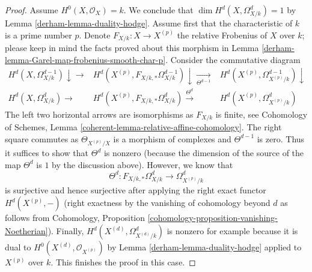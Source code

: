 \begin{proof}
\medskip\noindent
Assume $H^0(X, \mathcal{O}_X) = k$. We conclude that
$\dim H^d(X, \Omega^d_{X/k}) = 1$ by Lemma \ref{derham-lemma-duality-hodge}.
Assume first that the characteristic of $k$ is a prime number $p$.
Denote $F_{X/k} : X \to X^{(p)}$ the relative Frobenius of $X$ over $k$;
please keep in mind the facts proved about this morphism in
Lemma \ref{derham-lemma-Garel-map-frobenius-smooth-char-p}.
Consider the commutative diagram
$$
\begin{array}{ccc}H^d(X, \Omega^{d - 1}_{X/k}) \downarrow\longrightarrow & H^d(X^{(p)}, F_{X/k, *}\Omega^{d - 1}_{X/k}) \downarrow\underset{\Theta^{d - 1}}{\longrightarrow} & H^d(X^{(p)}, \Omega^{d - 1}_{X^{(p)}/k}) \downarrow \\ H^d(X, \Omega^d_{X/k}) \longrightarrow & H^d(X^{(p)}, F_{X/k, *}\Omega^d_{X/k}) \overset{\Theta^d}{\longrightarrow} & H^d(X^{(p)}, \Omega^d_{X^{(p)}/k})\end{array}
$$
The left two horizontal arrows are isomorphisms as $F_{X/k}$ is finite, see
Cohomology of Schemes, Lemma \ref{coherent-lemma-relative-affine-cohomology}.
The right square commutes as $\Theta_{X^{(p)}/X}$ is a morphism of
complexes and $\Theta^{d - 1}$ is zero. Thus it suffices to show that
$\Theta^d$ is nonzero (because the dimension of the source of the map
$\Theta^d$ is $1$ by the discussion above). However, we know that
$$
\Theta^d : F_{X/k, *}\Omega^d_{X/k} \to \Omega^d_{X^{(p)}/k}
$$
is surjective and hence surjective after applying the right exact
functor $H^d(X^{(p)}, -)$ (right exactness by the vanishing of cohomology
beyond $d$ as follows from
Cohomology, Proposition \ref{cohomology-proposition-vanishing-Noetherian}).
Finally, $H^d(X^{(d)}, \Omega^d_{X^{(d)}/k})$ is nonzero for example because
it is dual to $H^0(X^{(d)}, \mathcal{O}_{X^{(p)}})$ by
Lemma \ref{derham-lemma-duality-hodge} applied to $X^{(p)}$ over $k$.
This finishes the proof in this case.


\end{proof}
